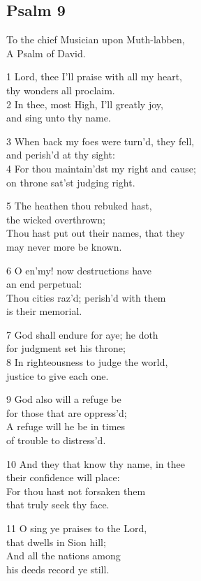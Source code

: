 \subsection*{Psalm 9 }


To the chief Musician upon Muth-labben,\\
A Psalm of David.

1 Lord, thee I’ll praise with all my heart,\\
thy wonders all proclaim.\\
2 In thee, most High, I’ll greatly joy,\\
and sing unto thy name.

3 When back my foes were turn’d, they fell,\\
and perish’d at thy sight:\\
4 For thou maintain’dst my right and cause;\\
on throne sat’st judging right.

5 The heathen thou rebuked hast,\\
the wicked overthrown;\\
Thou hast put out their names, that they\\
may never more be known.

6 O en’my! now destructions have\\
an end perpetual:\\
Thou cities raz’d; perish’d with them\\
is their memorial.

7 God shall endure for aye; he doth\\
for judgment set his throne;\\
8 In righteousness to judge the world,\\
justice to give each one.

9 God also will a refuge be\\
for those that are oppress’d;\\
A refuge will he be in times\\
of trouble to distress’d.

10 And they that know thy name, in thee\\
their confidence will place:\\
For thou hast not forsaken them\\
that truly seek thy face.

11 O sing ye praises to the Lord,\\
that dwells in Sion hill;\\
And all the nations among\\
his deeds record ye still.

